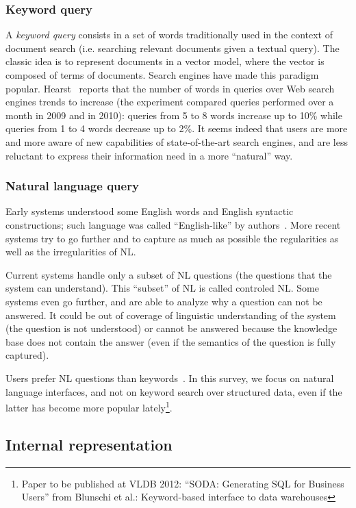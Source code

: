 \documentclass[10pt,journal,letterpaper,compsoc]{IEEEtran}
\begin{document}
\subsubsection{Keyword query}
A {\it keyword query} consists in a set of words
traditionally used in the context of document search (i.e. searching relevant
documents given a textual query).
The classic idea is to represent documents in a vector model, where the vector
is composed of terms of documents. Search engines have made this paradigm
popular.
Hearst~\cite{Hearst:2011:NSU:2018396.2018414} reports that the number of words
in queries over Web search engines trends to increase (the experiment compared
queries performed over a month in 2009 and in 2010): queries from 5 to 8 words
increase up to 10\% while queries from 1 to 4 words decrease up to 2\%.
It seems indeed that users are more and more aware of new capabilities of
state-of-the-art search engines, and are less reluctant to express their
information need in a more ``natural'' way.

\subsubsection{Natural language query}
Early systems understood some English words and English syntactic constructions;
such language was called ``English-like'' by
authors~\cite{Woods:1973:PNL:1499586.1499695}. More recent systems try to go
further and to capture as much as possible the regularities as well as the
irregularities of NL.

Current systems handle only a subset of NL questions (the questions that the
system can understand). This ``subset'' of NL is called controled NL. Some
systems even go further, and are able to analyze why a question can not be
answered. It could be out of coverage of linguistic understanding of the system
(the question is not understood) or cannot be answered because the knowledge
base does not contain the answer (even if the semantics of the question is
fully captured).

Users prefer NL questions than keywords~\cite{Hearst:2011:NSU:2018396.2018414}.
In this survey, we focus on natural language interfaces, and not on keyword
search over structured data, even if the latter has become more popular
lately\footnote{Paper to be published at VLDB 2012: ``SODA: Generating SQL for
Business Users'' from Blunschi et al.: Keyword-based interface to data
warehouses}.




\subsection{Internal representation}
\label{sec:big-picture-syntactic}
\end{document}
